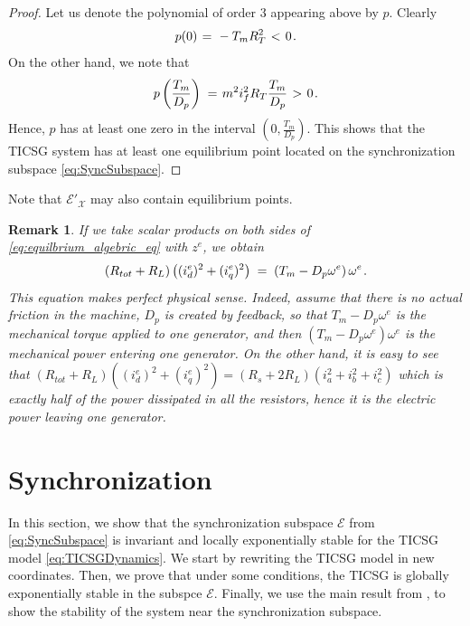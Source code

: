 \documentclass[letterpaper, 10 pt, conference]{ieeeconf}
\newtheorem{remark}[theorem]{Remark}
\renewcommand{\o}    {{\omega}}
\newcommand{\m}      {{\hbox{\hskip 1pt}}}
\newcommand{\Emscr}  {{\mathcal{E}}}
\newcommand{\Xmscr}  {{\mathcal{X}}}
\begin{document}
\begin{proof}
Let us denote the polynomial of order 3 appearing above by $p$. 
Clearly \vspace{-2mm}
$$p(0) \m=\m -T_m R_T^2 \m<\m 0 \m.$$
On the other hand, we note that 
$$ p\left(\frac{T_m}{D_p}\right) \m=\m m^2 i_f^2 R_T\frac{T_m}{D_p} 
   \m>\m 0 \m.$$
Hence, $p$ has at least one zero in the interval $\left(0,
\frac{T_m}{D_p}\right)$. This shows that the TICSG system has at least
one equilibrium point located on the synchronization subspace 
\eqref{eq:SyncSubspace}.
\end{proof}

Note that $\Emscr'_\Xmscr$ may also contain equilibrium points.

\begin{remark}
If we take scalar products on both sides of 
\eqref{eq:equilbrium_algebric_eq} with $z^e$, we obtain
$$ \left(R_{tot}+R_L\right)\left((i_d^e)^2+(i_q^e)^2\right) \m=\m
   \left(T_m-D_p\o^e\right)\o^e \m.$$
This equation makes perfect physical sense. Indeed, assume that there
is no actual friction in the machine, $D_{p}$ is created by feedback,
so that $T_{m}-D_{p}\omega^{e}$ is the mechanical torque applied to
one generator, and then $\left(T_{m}-D_{p}\omega^{e}\right)\omega^{e}$
is the mechanical power entering one generator. On the other hand, it
is easy to see that $\left(R_{tot}+R_L\right)\left((i_d^e)^2+
(i_q^e)^2\right)=\left(R_s+2R_L\right)\left(i_a^2+i_b^2+i_c^2\right)$
which is exactly half of the power dissipated in all the resistors,
hence it is the electric power leaving one generator.
\end{remark}

\section{Synchronization} \label{sec5} %

In this section, we show that the synchronization subspace
$\mathscr{E}$ from \eqref{eq:SyncSubspace} is invariant and locally
exponentially stable for the TICSG model \eqref{eq:TICSGDynamics}.  We
start by rewriting the TICSG model in new coordinates. Then, we prove
that under some conditions, the TICSG is globally exponentially stable
in the subspce $\mathscr{E}$. Finally, we use the main result from
\cite{AndrieuJayawardhanaPraly}, to show the stability of the system
near the synchronization subspace.

\end{document}
